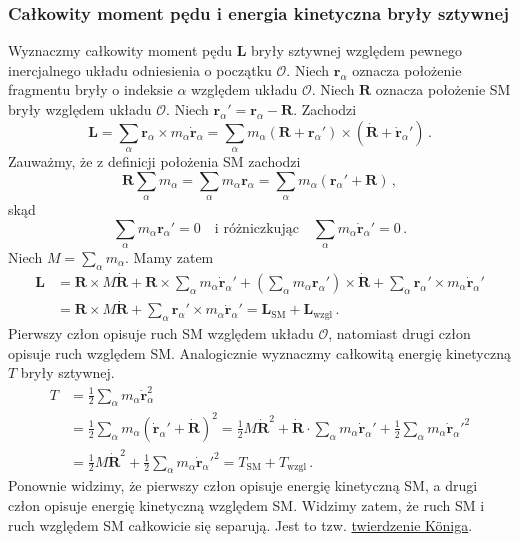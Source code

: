\documentclass[../main.tex]{subfiles}
\begin{document}
\subsubsection{Całkowity moment pędu i energia kinetyczna bryły sztywnej}
Wyznaczmy całkowity moment pędu \(\mathbf{L}\) bryły sztywnej względem pewnego inercjalnego układu
odniesienia o początku \(\mathcal{O}\). Niech \(\mathbf{r}_\alpha\) oznacza położenie fragmentu
bryły o indeksie \(\alpha\) względem układu \(\mathcal{O}\). Niech \(\mathbf{R}\) oznacza położenie
SM bryły względem układu \(\mathcal{O}\). Niech \(\mathbf{r}_\alpha'=\mathbf{r}_\alpha-\mathbf{R}\).
Zachodzi
\begin{equation*}
    \mathbf{L}=\sum_{\alpha}\mathbf{r}_\alpha\times m_\alpha\dot{\mathbf{r}}_\alpha=\sum_\alpha m_\alpha (\mathbf{R}+\mathbf{r}_\alpha')\times (\dot{\mathbf{R}}+\dot{\mathbf{r}}_\alpha')\,.
\end{equation*}
Zauważmy, że z definicji położenia SM zachodzi
\begin{equation*}
    \mathbf{R}\sum_\alpha m_\alpha=\sum_\alpha m_\alpha\mathbf{r}_\alpha=\sum_\alpha m_\alpha (\mathbf{r}_\alpha'+\mathbf{R})\,,
\end{equation*}
skąd
\begin{equation*}
    \sum_\alpha m_\alpha\mathbf{r}_\alpha'=0\quad\text{i różniczkując}\quad \sum_\alpha m_\alpha\dot{\mathbf{r}}_\alpha'=0\,.
\end{equation*}
Niech \(M=\sum_\alpha m_\alpha\). Mamy zatem
\begin{equation*}
\begin{split}
     \mathbf{L}&=\mathbf{R}\times M\dot{\mathbf{R}}+\mathbf{R}\times\sum_\alpha m_\alpha\dot{\mathbf{r}}_\alpha'+\left(\sum_\alpha m_\alpha\mathbf{r}_\alpha'\right)\times\dot{\mathbf{R}}+\sum_\alpha \mathbf{r}_\alpha'\times m_\alpha \dot{\mathbf{r}}_\alpha'\\
     &=\mathbf{R}\times M\dot{\mathbf{R}}+\sum_\alpha \mathbf{r}_\alpha'\times m_\alpha \dot{\mathbf{r}}_\alpha'=\mathbf{L}_\text{SM}+\mathbf{L}_\text{wzgl}\,.
\end{split}
\end{equation*}
Pierwszy człon opisuje ruch SM względem układu \(\mathcal{O}\), natomiast drugi człon opisuje ruch
względem SM. Analogicznie wyznaczmy całkowitą energię kinetyczną \(T\) bryły sztywnej.
\begin{equation*}
\begin{split}
    T&=\frac{1}{2}\sum_\alpha m_\alpha \dot{\mathbf{r}}_\alpha^2\\
    &=\frac{1}{2}\sum_\alpha m_\alpha \left(\dot{\mathbf{r}}_\alpha'+\dot{\mathbf{R}}\right)^2=\frac{1}{2}M\dot{\mathbf{R}}^2+\dot{\mathbf{R}}\cdot\sum_\alpha m_\alpha \dot{\mathbf{r}}_\alpha'+\frac{1}{2}\sum_\alpha m_\alpha \dot{\mathbf{r}}_\alpha'^2\\
    &=\frac{1}{2}M\dot{\mathbf{R}}^2+\frac{1}{2}\sum_\alpha m_\alpha \dot{\mathbf{r}}_\alpha'^2=T_\text{SM}+T_\text{wzgl}\,.
\end{split}
\end{equation*}
Ponownie widzimy, że pierwszy człon opisuje energię kinetyczną SM, a drugi człon opisuje energię
kinetyczną względem SM. Widzimy zatem, że ruch SM i ruch względem SM całkowicie się separują. Jest
to tzw. \underline{twierdzenie Königa}.
\end{document}
